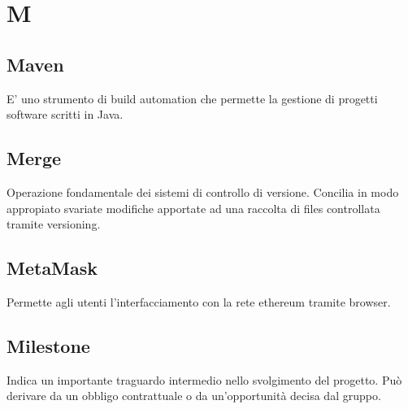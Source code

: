 \section*{M}

\subsection{Maven}
E' uno strumento di build automation che permette la gestione di progetti software scritti in Java.

\subsection{Merge} 
Operazione fondamentale dei sistemi di controllo di versione. Concilia in modo appropiato svariate modifiche apportate ad una raccolta di files controllata tramite versioning.

\subsection{MetaMask}
Permette agli utenti l'interfacciamento con la rete ethereum tramite browser.

\subsection{Milestone} 
Indica un importante traguardo intermedio nello svolgimento del progetto. Può derivare da un obbligo contrattuale o da un'opportunità decisa dal gruppo.

